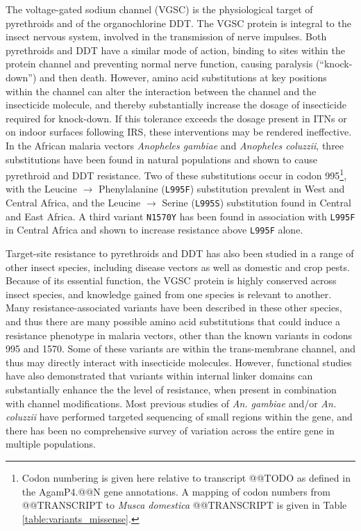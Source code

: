 \documentclass[a4paper,11pt,abstracton]{scrartcl}
\begin{document}
The voltage-gated sodium channel (VGSC) is the physiological target of pyrethroids and of the organochlorine DDT.
%
The VGSC protein is integral to the insect nervous system, involved in the transmission of nerve impulses.
%
Both pyrethroids and DDT have a similar mode of action, binding to sites within the protein channel and preventing normal nerve function, causing paralysis (``knock-down'') and then death.
%
However, amino acid substitutions at key positions within the channel can alter the interaction between the channel and the insecticide molecule, and thereby substantially increase the dosage of insecticide required for knock-down.
%
If this tolerance exceeds the dosage present in ITNs or on indoor surfaces following IRS, these interventions may be rendered ineffective.
%
In the African malaria vectors \emph{Anopheles gambiae} and \emph{Anopheles coluzzii}, three substitutions have been found in natural populations and shown to cause pyrethroid and DDT resistance.
%
Two of these substitutions occur in codon 995\footnote{Codon numbering is given here relative to transcript @@TODO as defined in the AgamP4.@@N gene annotations. A mapping of codon numbers from @@TRANSCRIPT to \emph{Musca domestica} @@TRANSCRIPT is given in Table \ref{table:variants_missense}.}, with the Leucine $\rightarrow$ Phenylalanine (\texttt{L995F}) substitution prevalent in West and Central Africa, and the Leucine $\rightarrow$ Serine (\texttt{L995S}) substitution found in Central and East Africa.
%
A third variant \texttt{N1570Y} has been found in association with \texttt{L995F} in Central Africa and shown to increase resistance above \texttt{L995F} alone.

Target-site resistance to pyrethroids and DDT has also been studied in a range of other insect species, including disease vectors as well as domestic and crop pests.
%
Because of its essential function, the VGSC protein is highly conserved across insect species, and knowledge gained from one species is relevant to another.
%
Many resistance-associated variants have been described in these other species, and thus there are many possible amino acid substitutions that could induce a resistance phenotype in malaria vectors, other than the known variants in codons 995 and 1570.
%
Some of these variants are within the trans-membrane channel, and thus may directly interact with insecticide molecules.
%
However, functional studies have also demonstrated that variants within internal linker domains can substantially enhance the the level of resistance, when present in combination with channel modifications.
%
Most previous studies of \emph{An. gambiae} and/or \emph{An. coluzzii} have performed targeted sequencing of small regions within the gene, and there has been no comprehensive survey of variation across the entire gene in multiple populations.
\end{document}
